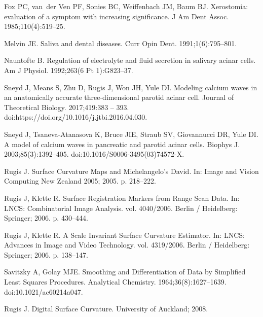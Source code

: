\documentclass[10pt,letterpaper]{article}
\begin{document}
%

\begin{thebibliography}{10}

Fox PC, van~der Ven PF, Sonies BC, Weiffenbach JM, Baum BJ.
\newblock Xerostomia: evaluation of a symptom with increasing significance.
\newblock J Am Dent Assoc. 1985;110(4):519--25.

Melvin JE.
\newblock Saliva and dental diseases.
\newblock Curr Opin Dent. 1991;1(6):795--801.

Nauntofte B.
\newblock Regulation of electrolyte and fluid secretion in salivary acinar
  cells.
\newblock Am J Physiol. 1992;263(6 Pt 1):G823--37.

Sneyd J, Means S, Zhu D, Rugis J, Won JH, Yule DI.
\newblock Modeling calcium waves in an anatomically accurate three-dimensional
  parotid acinar cell.
\newblock Journal of Theoretical Biology. 2017;419:383 -- 393.
\newblock doi:{https://doi.org/10.1016/j.jtbi.2016.04.030}.

Sneyd J, Tsaneva-Atanasova K, Bruce JIE, Straub SV, Giovannucci DR, Yule DI.
\newblock A model of calcium waves in pancreatic and parotid acinar cells.
\newblock Biophys J. 2003;85(3):1392--405.
\newblock doi:{10.1016/S0006-3495(03)74572-X}.

Rugis J.
\newblock Surface Curvature Maps and {M}ichelangelo's {D}avid.
\newblock In: Image and Vision Computing New Zealand 2005; 2005. p. 218--222.

Rugis J, Klette R.
\newblock Surface Registration Markers from Range Scan Data.
\newblock In: LNCS: Combinatorial Image Analysis. vol. 4040/2006. Berlin /
  Heidelberg: Springer; 2006. p. 430--444.

Rugis J, Klette R.
\newblock A Scale Invariant Surface Curvature Estimator.
\newblock In: LNCS: Advances in Image and Video Technology. vol. 4319/2006.
  Berlin / Heidelberg: Springer; 2006. p. 138--147.

Savitzky A, Golay MJE.
\newblock Smoothing and Differentiation of Data by Simplified Least Squares
  Procedures.
\newblock Analytical Chemistry. 1964;36(8):1627--1639.
\newblock doi:{10.1021/ac60214a047}.

Rugis J.
\newblock Digital Surface Curvature.
\newblock University of Auckland; 2008.


\end{thebibliography}
\end{document}
